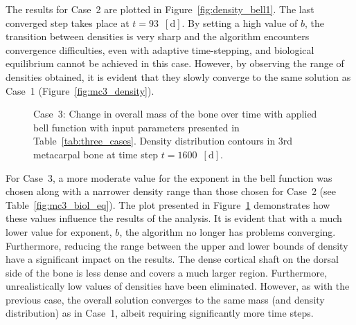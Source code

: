 \documentclass[11pt]{acmeArticle}
\numberwithin{equation}{section}
\begin{document}
The results for Case~2 are plotted in Figure~\ref{fig:density_bell1}.
The last converged step takes place at $t=93$~$[{\text{d}}]$. 
By setting a high value of $b$, the transition between densities is very sharp and the algorithm encounters convergence difficulties, even with adaptive time-stepping, and biological equilibrium cannot be achieved in this case. 
However, by observing the range of densities obtained, it is evident that they slowly converge to the same solution as Case~1 (Figure~\ref{fig:mc3_density}). 
\begin{figure}[h!]
\centering
	
		\caption{Case~3: Change in overall mass of the bone over time with applied bell function with input parameters presented in Table~\ref{tab:three_cases}. Density distribution contours in 3rd metacarpal bone at time step $t=1600$~$[{\text{d}}]$.}
		\label{fig:density_bell2}
\end{figure}

For Case~3, a more moderate value for the exponent in the bell function was chosen along with a narrower density range than those chosen for Case~2 (see Table~\ref{fig:mc3_biol_eq}).
The plot presented in Figure~\ref{fig:density_bell2} demonstrates how these values influence the results of the analysis. 
It is evident that with a much lower value for exponent, $b$, the algorithm no longer has problems converging. 
Furthermore,  reducing the range between the upper and lower bounds of density have a significant impact on the results. 
The dense cortical shaft on the dorsal side of the bone is less dense and covers a much larger region. 
Furthermore, unrealistically low values of densities have been eliminated. 
However, as with the previous case, the overall solution converges to the same mass (and density distribution) as in Case~1, albeit requiring significantly more time steps. \\
\end{document}

